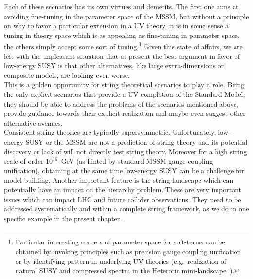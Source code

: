 \documentclass[12pt,a4paper]{book}
\begin{document}
Each of these scenarios has its own virtues and demerits. The first one aims at avoiding fine-tuning in the parameter space of the MSSM, but without a principle on why to favor a particular extension in a UV theory, it is in some sense a tuning in theory space which is as appealing as fine-tuning in parameter space, the others simply accept some sort of tuning.\footnote{Particular interesting corners of parameter space for soft-terms can be obtained by invoking principles such as precision gauge coupling unification~\cite{Krippendorf:2013dqa} or by identifying pattern in underlying UV theories (e.g.~realization of natural SUSY and compressed spectra in the Heterotic mini-landscape~\cite{Krippendorf:2012ir,Badziak:2012yg}).} Given this state of affairs, we are left with the unpleasant situation that at present the best argument in favor of low-energy SUSY is that other alternatives, like large extra-dimensions or composite models, are looking even worse.\\

This is a golden opportunity for string theoretical scenarios to play a role. Being the only explicit scenarios that provide a UV completion of the Standard Model, they should be able to address the problems of the scenarios mentioned above,
provide guidance towards their explicit realization and maybe even suggest other alternative avenues.\\

Consistent string theories are typically supersymmetric. Unfortunately, low-energy SUSY or the MSSM are not a prediction of string theory and its potential discovery or lack of will not directly test string theory. Moreover for a high string scale of order $10^{16}$~GeV (as hinted by standard MSSM gauge coupling unification), obtaining at the same time low-energy SUSY can be a challenge for model building. Another important feature is the string landscape which can potentially have an impact on the hierarchy problem. These are very important issues which can impact LHC and future collider observations. They need to be addressed systematically and within a complete string framework, as we do in one specific example in the present chapter.\\
\end{document}
